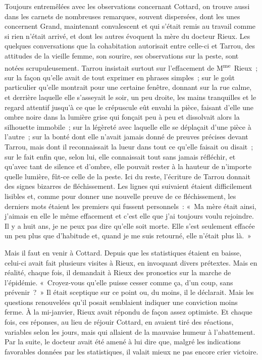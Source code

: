 \documentclass[french,twoside]{book} %
\begin{document}
Toujours entremêlées avec les observations concernant Cottard, on trouve aussi dans les carnets de nombreuses remarques, souvent dispersées, dont les unes concernent Grand, maintenant convalescent et qui s’était remis au travail comme si rien n’était arrivé, et dont les autres évoquent la mère du docteur Rieux. Les quelques conversations que la cohabitation autorisait entre celle-ci et Tarrou, des attitudes de la vieille femme, son sourire, ses observations sur la peste, sont notées scrupuleusement. Tarrou insistait surtout sur l’effacement de M\textsuperscript{me} Rieux ; sur la façon qu’elle avait de tout exprimer en phrases simples ; sur le goût particulier qu’elle montrait pour une certaine fenêtre, donnant sur la rue calme, et derrière laquelle elle s’asseyait le soir, un peu droite, les mains tranquilles et le regard attentif jusqu’à ce que le crépuscule eût envahi la pièce, faisant d’elle une ombre noire dans la lumière grise qui fonçait peu à peu et dissolvait alors la silhouette immobile ; sur la légèreté avec laquelle elle se déplaçait d’une pièce à l’autre ; sur la bonté dont elle n’avait jamais donné de preuves précises devant Tarrou, mais dont il reconnaissait la lueur dans tout ce qu’elle faisait ou disait ; sur le fait enfin que, selon lui, elle connaissait tout sans jamais réfléchir, et qu’avec tant de silence et d’ombre, elle pouvait rester à la hauteur de n’importe quelle lumière, fût-ce celle de la peste. Ici du reste, l’écriture de Tarrou donnait des signes bizarres de fléchissement. Les lignes qui suivaient étaient difficilement lisibles et, comme pour donner une nouvelle preuve de ce fléchissement, les derniers mots étaient les premiers qui fussent personnels : « Ma mère était ainsi, j’aimais en elle le même effacement et c’est elle que j’ai toujours voulu rejoindre. Il y a huit ans, je ne peux pas dire qu’elle soit morte. Elle s’est seulement effacée un peu plus que d’habitude et, quand je me suis retourné, elle n’était plus là. »\par
Mais il faut en venir à Cottard. Depuis que les statistiques étaient en baisse, celui-ci avait fait plusieurs visites à Rieux, en invoquant divers prétextes. Mais en réalité, chaque fois, il demandait à Rieux des pronostics sur la marche de l’épidémie. « Croyez-vous qu’elle puisse cesser comme ça, d’un coup, sans prévenir ? » Il était sceptique sur ce point ou, du moins, il le déclarait. Mais les questions renouvelées qu’il posait semblaient indiquer une conviction moins ferme. À la mi-janvier, Rieux avait répondu de façon assez optimiste. Et chaque fois, ces réponses, au lieu de réjouir Cottard, en avaient tiré des réactions, variables selon les jours, mais qui allaient de la mauvaise humeur à l’abattement. Par la suite, le docteur avait été amené à lui dire que, malgré les indications favorables données par les statistiques, il valait mieux ne pas encore crier victoire.\par
\end{document}
